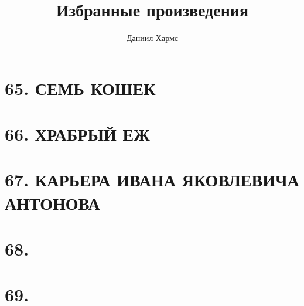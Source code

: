 \documentclass{article}
\title{Избранные произведения}
\author{Даниил Хармс}
\date{}
\begin{document}
\maketitle{}
\section*{65. СЕМЬ  КОШЕК}


\section*{66. ХРАБРЫЙ  ЕЖ}


\section*{67. КАРЬЕРА ИВАНА ЯКОВЛЕВИЧА АНТОНОВА}


\section*{68.}


\section*{69.}

\end{document}
